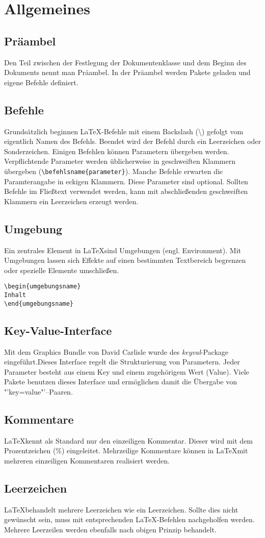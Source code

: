 \chapter{Allgemeines}
\section{Präambel}
Den Teil zwischen der Festlegung der Dokumentenklasse und dem Beginn des Dokuments nennt man Präambel. In der Präambel werden Pakete geladen und eigene Befehle definiert.
\section{Befehle}
Grundsätzlich beginnen \LaTeX-Befehle mit einem Backslash (\textbackslash{}) gefolgt vom eigentlich Namen des Befehls. Beendet wird der Befehl durch ein Leerzeichen oder Sonderzeichen. Einigen Befehlen können Parametern übergeben werden. Verpflichtende Parameter werden üblicherweise in geschweiften Klammern übergeben (\verb=\befehlsname{parameter}=). Manche Befehle erwarten die Paramterangabe in eckigen Klammern. Diese Parameter sind optional. Sollten Befehle im Fließtext verwendet werden, kann mit abschließenden geschweiften Klammern ein Leerzeichen erzeugt werden.
\section{Umgebung}
Ein zentrales Element in \LaTeX sind Umgebungen (engl. Environment). Mit Umgebungen lassen sich Effekte auf einen bestimmten Textbereich begrenzen oder spezielle Elemente umschließen.
\begin{lstlisting}[caption={Umgebung}]
\begin{umgebungsname}
Inhalt
\end{umgebungsname}
\end{lstlisting}
\section{Key-Value-Interface}
Mit dem Graphics Bundle von David Carlisle wurde des \textsl{keyval}-Package eingeführt.Dieses Interface regelt die Strukturierung von Parametern. Jeder Parameter besteht aus einem Key und einem zugehörigem Wert (Value). Viele Pakete benutzen dieses Interface und ermöglichen damit die Übergabe von "'key=value"'--Paaren.
\section{Kommentare}
\LaTeX kennt als Standard nur den einzeiligen Kommentar. Dieser wird mit dem Prozentzeichen (\%) eingeleitet. Mehrzeilige Kommentare können in \LaTeX mit mehreren einzeiligen Kommentaren realisiert werden.
\section{Leerzeichen}
\LaTeX behandelt mehrere Leerzeichen wie ein Leerzeichen. Sollte dies nicht gewünscht sein, muss mit entsprechenden \LaTeX-Befehlen nachgeholfen werden. Mehrere Leerzeilen werden ebenfalls nach obigen Prinzip behandelt.
